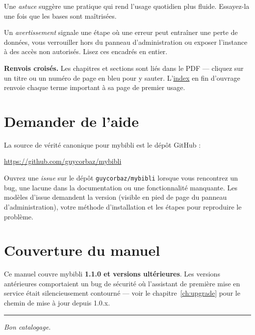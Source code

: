 \begin{tip}
Une \emph{astuce} suggère une pratique qui rend l'usage quotidien
plus fluide. Essayez-la une fois que les bases sont maîtrisées.
\end{tip}

\begin{warning}
Un \emph{avertissement} signale une étape où une erreur peut
entraîner une perte de données, vous verrouiller hors du panneau
d'administration ou exposer l'instance à des accès non autorisés.
Lisez ces encadrés en entier.
\end{warning}

\textbf{Renvois croisés.} Les chapitres et sections sont liés dans le
PDF — cliquez sur un titre ou un numéro de page en bleu pour y
sauter. L'\hyperref[index]{index} en fin d'ouvrage renvoie chaque
terme important à sa page de premier usage.

\section*{Demander de l'aide}

La source de vérité canonique pour mybibli est le dépôt GitHub :

\begin{center}
\url{https://github.com/guycorbaz/mybibli}
\end{center}

Ouvrez une \emph{issue} sur le dépôt \texttt{guycorbaz/mybibli}
lorsque vous rencontrez un bug, une lacune dans la documentation ou
une fonctionnalité manquante. Les modèles d'issue demandent la
version (visible en pied de page du panneau d'administration), votre
méthode d'installation et les étapes pour reproduire le problème.

\section*{Couverture du manuel}

Ce manuel couvre mybibli \textbf{1.1.0 et versions ultérieures}. Les
versions antérieures comportaient un bug de sécurité où l'assistant
de première mise en service était silencieusement contourné — voir le
chapitre~\ref{ch:upgrade} pour le chemin de mise à jour depuis 1.0.x.

\vspace{1cm}
\hrule
\vspace{0.5cm}
\textit{Bon catalogage.}
